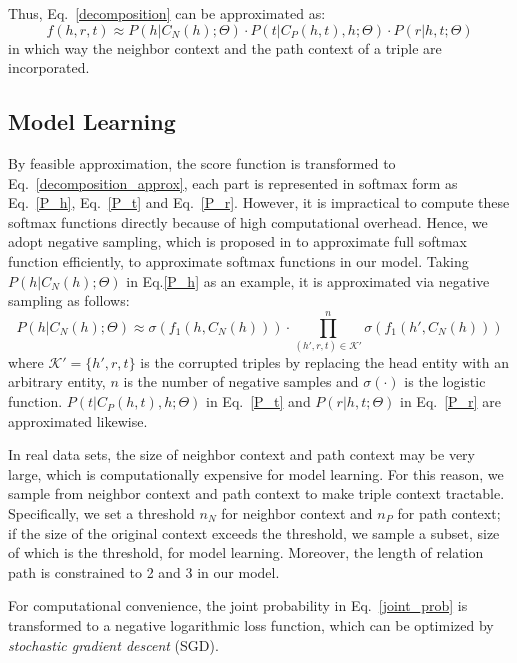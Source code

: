 Thus, Eq.~\eqref{decomposition} can be approximated as:
\begin{equation}\label{decomposition_approx}
  f(h,r,t) \approx P(h|C_N(h);\Theta) \cdot P(t|C_P(h,t),h;\Theta) \cdot P(r|h,t;\Theta)
\end{equation}
in which way the neighbor context and the path context of a triple are incorporated.


\subsection{Model Learning}
By feasible approximation, the score function is transformed to Eq.~\eqref{decomposition_approx}, each part is represented in softmax form as Eq.~\eqref{P_h}, Eq.~\eqref{P_t} and Eq.~\eqref{P_r}. However, it is impractical to compute these softmax functions directly because of high computational overhead. Hence, we adopt negative sampling, which is proposed in \cite{DBLP:conf/nips/MikolovSCCD13} to approximate full softmax function efficiently, to approximate softmax functions in our model. Taking $P(h|C_N(h);\Theta)$ in Eq.\eqref{P_h} as an example, it is approximated via negative sampling as follows:
\begin{equation}\label{approximation}
    P(h|C_N(h);\Theta) \approx \sigma(f_1(h, C_N(h))) \cdot \prod_{(h',r,t) \in \mathcal{K}'}^{n} \sigma(f_1(h', C_N(h)))
\end{equation}
where $\mathcal{K}' = \{h', r, t\}$ is the corrupted triples by replacing the head entity with an arbitrary entity, $n$ is the number of negative samples and $\sigma(\cdot)$ is the logistic function. $P(t|C_P(h,t),h;\Theta)$ in Eq.~\eqref{P_t} and $P(r|h,t;\Theta)$ in Eq.~\eqref{P_r} are approximated likewise.

In real data sets, the size of neighbor context and path context may be very large, which is computationally expensive for model learning. For this reason, we sample from neighbor context and path context to make triple context tractable. Specifically, we set a threshold $n_N$ for neighbor context and $n_P$ for path context; if the size of the original context exceeds the threshold, we sample a subset, size of which is the threshold, for model learning. Moreover, the length of relation path is constrained to 2 and 3 in our model.

For computational convenience, the joint probability in Eq.~\eqref{joint_prob} is transformed to a negative logarithmic loss function, which can be optimized by \emph{stochastic gradient descent} (SGD).

